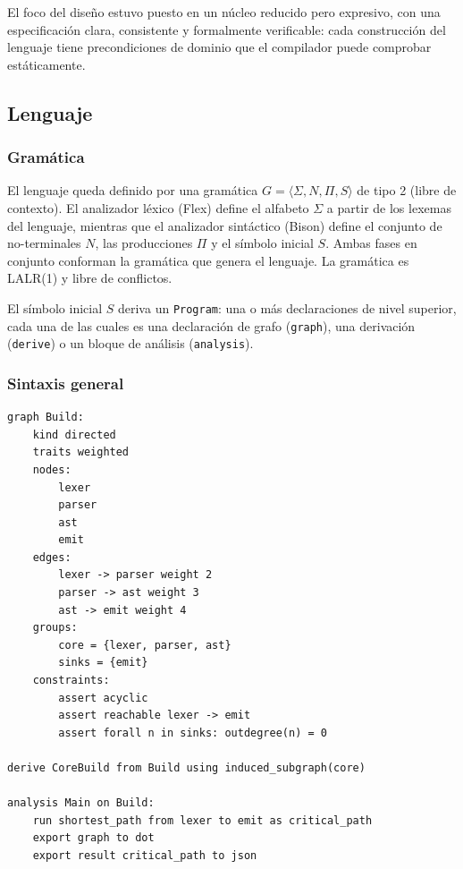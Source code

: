 \documentclass[11pt,a4paper]{article}
\newcommand{\code}[1]{\texttt{#1}}
\begin{document}
El foco del diseño estuvo puesto en un núcleo reducido pero expresivo, con una
especificación clara, consistente y formalmente verificable: cada construcción
del lenguaje tiene precondiciones de dominio que el compilador puede comprobar
estáticamente.

\subsection{Lenguaje}

\subsubsection{Gramática}

El lenguaje queda definido por una gramática
$G = \langle \Sigma, N, \Pi, S \rangle$ de tipo 2 (libre de contexto). El
analizador léxico (Flex) define el alfabeto $\Sigma$ a partir de los lexemas
del lenguaje, mientras que el analizador sintáctico (Bison) define el conjunto
de no-terminales $N$, las producciones $\Pi$ y el símbolo inicial $S$. Ambas
fases en conjunto conforman la gramática que genera el lenguaje. La gramática
es LALR(1) y libre de conflictos.

El símbolo inicial $S$ deriva un \code{Program}: una o más declaraciones de
nivel superior, cada una de las cuales es una declaración de grafo
(\code{graph}), una derivación (\code{derive}) o un bloque de análisis
(\code{analysis}).

\subsubsection{Sintaxis general}

\begin{lstlisting}
graph Build:
    kind directed
    traits weighted
    nodes:
        lexer
        parser
        ast
        emit
    edges:
        lexer -> parser weight 2
        parser -> ast weight 3
        ast -> emit weight 4
    groups:
        core = {lexer, parser, ast}
        sinks = {emit}
    constraints:
        assert acyclic
        assert reachable lexer -> emit
        assert forall n in sinks: outdegree(n) = 0

derive CoreBuild from Build using induced_subgraph(core)

analysis Main on Build:
    run shortest_path from lexer to emit as critical_path
    export graph to dot
    export result critical_path to json
\end{lstlisting}
\end{document}
